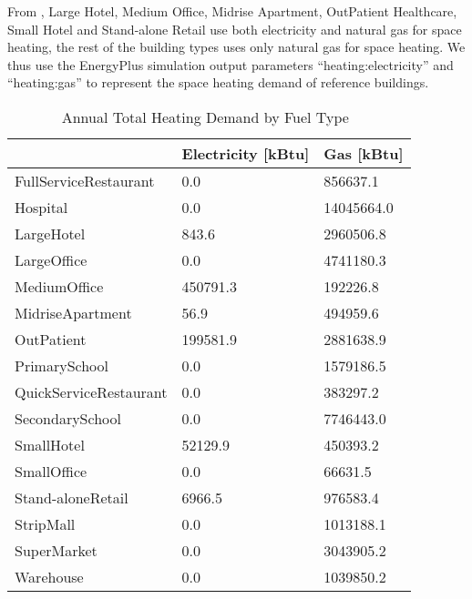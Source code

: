 From , Large Hotel, Medium Office, Midrise
Apartment, OutPatient Healthcare, Small Hotel and Stand-alone Retail
use both electricity and natural gas for space heating, the rest of
the building types uses only natural gas for space heating. We thus
use the EnergyPlus simulation output parameters
``heating:electricity'' and ``heating:gas'' to represent the space
heating demand of reference buildings.
\begin{table}[h]
\centering
\caption{Annual Total Heating Demand by Fuel Type~\cite{DOE2015}}
\label{tab:heatFuel}
\begin{tabular}{lll}
  \hline
                       & Electricity {[}kBtu{]} & Gas {[}kBtu{]} \\
  \hline
  \hline
FullServiceRestaurant  & 0.0                    & 856637.1       \\
Hospital               & 0.0                    & 14045664.0     \\
LargeHotel             & 843.6                  & 2960506.8      \\
LargeOffice            & 0.0                    & 4741180.3      \\
MediumOffice           & 450791.3               & 192226.8       \\
MidriseApartment       & 56.9                   & 494959.6       \\
OutPatient             & 199581.9               & 2881638.9      \\
PrimarySchool          & 0.0                    & 1579186.5      \\
QuickServiceRestaurant & 0.0                    & 383297.2       \\
SecondarySchool        & 0.0                    & 7746443.0      \\
SmallHotel             & 52129.9                & 450393.2       \\
SmallOffice            & 0.0                    & 66631.5        \\
Stand-aloneRetail      & 6966.5                 & 976583.4       \\
StripMall              & 0.0                    & 1013188.1      \\
SuperMarket            & 0.0                    & 3043905.2      \\
Warehouse              & 0.0                    & 1039850.2     \\
  \hline
\end{tabular}
\end{table}

